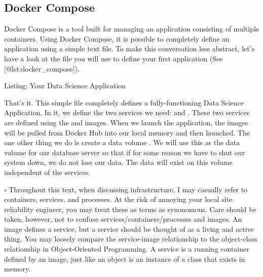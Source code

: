 \documentclass[letterpaper,10pt,english]{sphinxmanual}
\begin{document}
\subsection{Docker Compose}
\label{\detokenize{02-elastic-compute-cloud:Docker-Compose}}
Docker Compose is a tool built for managing an application consisting of
multiple containers. Using Docker Compose, it is possible to completely
define an application using a simple text file. To make this
conversation less abstract, let’s have a look at the
 file you will use to define your first
application (See {[}@lst:docker\_compose{]}).

Listing: Your Data Science Application

%
\begin{sphinxVerbatim}[commandchars=\\\{\}]
 
     
     
       
\end{sphinxVerbatim}

That’s it. This simple file completely defines a fully-functioning Data
Science Application. In it, we define the two services we need:
 and . These two services are defined using
the  and  images. When we launch
the application, the images will be pulled from Docker Hub into our
local memory and then launched. The one other thing we do is create a
data volume . We will use this as the data volume for
our database server so that if for some reason we have to shut our
system down, we do not lose our data. The data will exist on this volume
independent of the services.

\(\square\)  Throughout this text, when discussing
infrastructure, I may casually refer to containers, services, and
processes. At the risk of annoying your local site reliability engineer,
you may treat these as terms as synonomous. Care should be taken,
however, not to confuse services/containers/processes and images. An
image defines a service, but a service should be thought of as a living
and active thing. You may loosely compare the service-image relationship
to the object-class relationship in Object-Oriented Programming. A
service is a running container defined by an image, just like an object
is an instance of a class that exists in memory.
\end{document}
